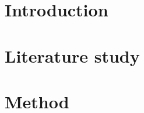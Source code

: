 \documentclass[12pt, english, oneside, singlespacing, open=any]{report}
\begin{document}
 
 
\tableofcontents
 
\chapter{Introduction}
 
\chapter{Literature study}
 
\chapter{Method}
 
\end{document}
